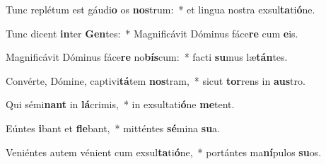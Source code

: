 \item Tunc replétum est gáudi\textbf{o} os \textbf{nos}trum:~* et lingua nostra exsul\textbf{ta}ti\textbf{ó}ne.
\item Tunc dicent \textbf{in}ter \textbf{Gen}tes:~* Magnificávit Dóminus fáce\textbf{re} cum \textbf{e}is.
\item Magnificávit Dóminus fáce\textbf{re} no\textbf{bís}cum:~* facti \textbf{su}mus læ\textbf{tán}tes.
\item Convérte, Dómine, captivi\textbf{tá}tem \textbf{nos}tram,~* sicut \textbf{tor}rens in \textbf{aus}tro.
\item Qui sémi\textbf{nant} in \textbf{lá}crimis,~* in exsultati\textbf{ó}ne \textbf{me}tent.
\item Eúntes \textbf{i}bant et \textbf{fle}bant,~* mitténtes \textbf{sé}mina \textbf{su}a.
\item Veniéntes autem vénient cum exsul\textbf{ta}ti\textbf{ó}ne,~* portántes ma\textbf{ní}pulos \textbf{su}os.
